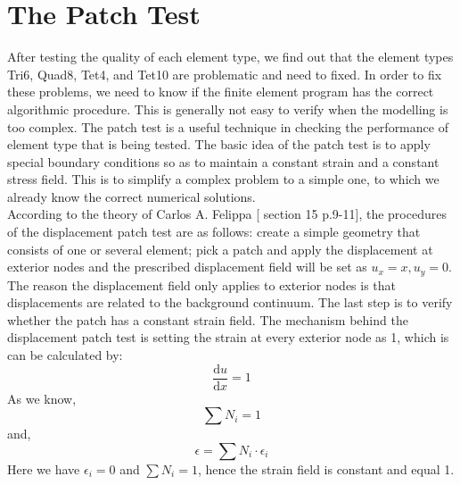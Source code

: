 \section{The Patch Test}
After testing the quality of each element type, we find out that the element types Tri6, Quad8, Tet4, and Tet10 are problematic and need to fixed. In order to fix these problems, we need to know if the finite element program has the correct algorithmic procedure. This is generally not easy to verify when the modelling is too complex. The patch test is a useful technique in checking the performance of element type that is being tested. The basic idea of the patch test is to apply special boundary conditions so as to maintain a constant strain and a constant stress field. This is to simplify a complex problem to a simple one, to which we already know the correct numerical solutions. \\
According to the theory of Carlos A. Felippa [\cite{Felippa} section 15 p.9-11], the procedures of the displacement patch test are as follows: create a simple geometry that consists of one or several element; pick a patch and apply the displacement at exterior nodes and the prescribed displacement field will be set as $u_x = x, u_y = 0$. The reason the displacement field only applies to exterior nodes is that displacements are related to the background continuum. The last step is to verify whether the patch has a constant strain field. The mechanism behind the displacement patch test is setting the strain at every exterior node as 1, which is can be calculated by:
\begin{equation}
\frac{\mathrm d u}{\mathrm d x} = 1
\end{equation}
As we know, 
\begin{equation}
\sum N_i = 1
\end{equation}
and, 
\begin{equation}
\epsilon = \sum N_i \cdot \epsilon_{i}
\end{equation}
Here we have $\epsilon_i = 0$ and $\sum N_i = 1$, hence the strain field is constant and equal 1. \\
